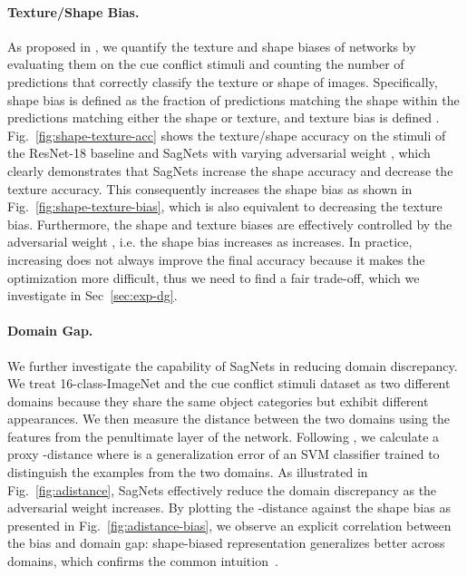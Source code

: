 \paragraph{\textnormal{\textbf{Texture/Shape Bias.}}}
As proposed in \cite{geirhos2019imagenet}, we quantify the texture and shape biases of networks by evaluating them on the cue conflict stimuli and counting the number of predictions that correctly classify the texture or shape of images.
Specifically, shape bias is defined as the fraction of predictions matching the shape within the predictions matching either the shape or texture, and texture bias is defined .
Fig.~\ref{fig:shape-texture-acc} shows the texture/shape accuracy on the stimuli of the ResNet-18 baseline and SagNets with varying adversarial weight , which clearly demonstrates that SagNets increase the shape accuracy and decrease the texture accuracy.
This consequently increases the shape bias as shown in Fig.~\ref{fig:shape-texture-bias}, which is also equivalent to decreasing the texture bias.
Furthermore, the shape and texture biases are effectively controlled by the adversarial weight , i.e. the shape bias increases as  increases.
In practice, increasing  does not always improve the final accuracy because it makes the optimization more difficult, thus we need to find a fair trade-off, which we investigate in Sec~\ref{sec:exp-dg}.


\paragraph{\textnormal{\textbf{Domain Gap.}}}
We further investigate the capability of SagNets in reducing domain discrepancy.
We treat 16-class-ImageNet and the cue conflict stimuli dataset as two different domains because they share the same object categories but exhibit different appearances.
We then measure the distance between the two domains using the features from the penultimate layer of the network.
Following \cite{mingsheng2015learning}, we calculate a proxy -distance  where  is a generalization error of an SVM classifier trained to distinguish the examples from the two domains.
As illustrated in Fig.~\ref{fig:adistance}, SagNets effectively reduce the domain discrepancy as the adversarial weight increases.
By plotting the -distance against the shape bias as presented in Fig.~\ref{fig:adistance-bias},
we observe an explicit correlation between the bias and domain gap: shape-biased representation generalizes better across domains, which confirms the common intuition~\cite{Hosseini2018AssessingSB,geirhos2019imagenet,Hermann2019ExploringTO}.


